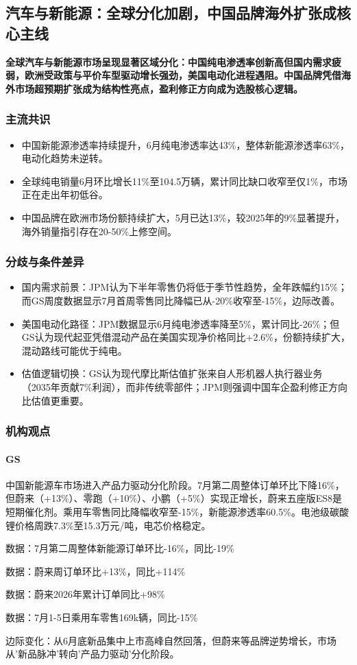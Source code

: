 \documentclass[11pt]{ctexart}
\begin{document}
\subsection{汽车与新能源：全球分化加剧，中国品牌海外扩张成核心主线}
\textbf{全球汽车与新能源市场呈现显著区域分化：中国纯电渗透率创新高但国内需求疲弱，欧洲受政策与平价车型驱动增长强劲，美国电动化进程遇阻。中国品牌凭借海外市场超预期扩张成为结构性亮点，盈利修正方向成为选股核心逻辑。}
\subsubsection*{主流共识}
\begin{itemize}
  \item 中国新能源渗透率持续提升，6月纯电渗透率达43\%，整体新能源渗透率63\%，电动化趋势未逆转。
  \item 全球纯电销量6月环比增长11\%至104.5万辆，累计同比缺口收窄至仅1\%，市场正在走出年初低谷。
  \item 中国品牌在欧洲市场份额持续扩大，5月已达13\%，较2025年的9\%显著提升，海外销量指引存在20-50\%上修空间。
\end{itemize}
\subsubsection*{分歧与条件差异}
\begin{itemize}
  \item 国内需求前景：JPM认为下半年零售仍将低于季节性趋势，全年跌幅约15\%；而GS周度数据显示7月首周零售同比降幅已从-20\%收窄至-15\%，边际改善。
  \item 美国电动化路径：JPM数据显示6月纯电渗透率降至5\%，累计同比-26\%；但GS认为现代起亚凭借混动产品在美国实现净价格同比+2.6\%，份额持续扩大，混动路线可能优于纯电。
  \item 估值逻辑切换：GS认为现代摩比斯估值扩张来自人形机器人执行器业务（2035年贡献7\%利润），而非传统零部件；JPM则强调中国车企盈利修正方向比估值更重要。
\end{itemize}
\subsubsection*{机构观点}
\paragraph{GS} 中国新能源车市场进入产品力驱动分化阶段。7月第二周整体订单环比下降16\%，但蔚来（+13\%）、零跑（+10\%）、小鹏（+5\%）实现正增长，蔚来五座版ES8是短期催化剂。乘用车零售同比降幅收窄至-15\%，新能源渗透率60.5\%。电池级碳酸锂价格周跌7.3\%至15.3万元/吨，电芯价格稳定。
{\small\color{refgray}数据：7月第二周整体新能源订单环比-16\%，同比-19\%\par}
{\small\color{refgray}数据：蔚来周订单环比+13\%，同比+114\%\par}
{\small\color{refgray}数据：蔚来2026年累计订单同比+98\%\par}
{\small\color{refgray}数据：7月1-5日乘用车零售169k辆，同比-15\%\par}
{\small\color{refgray}边际变化：从6月底新品集中上市高峰自然回落，但蔚来等品牌逆势增长，市场从'新品脉冲'转向'产品力驱动'分化阶段。\par}
\end{document}
